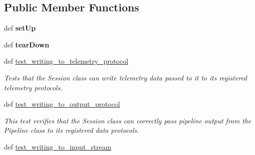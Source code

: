 \subsection*{Public Member Functions}
\begin{DoxyCompactItemize}
\item 
\hypertarget{classhwm_1_1sessions_1_1tests_1_1test__session_1_1_test_session_a6ebfe0c0771bd2fb341e72d71db092a9}{def {\bfseries set\-Up}}\label{classhwm_1_1sessions_1_1tests_1_1test__session_1_1_test_session_a6ebfe0c0771bd2fb341e72d71db092a9}

\item 
\hypertarget{classhwm_1_1sessions_1_1tests_1_1test__session_1_1_test_session_a25226f9f9452d7fa0dfd7c89fd116bcd}{def {\bfseries tear\-Down}}\label{classhwm_1_1sessions_1_1tests_1_1test__session_1_1_test_session_a25226f9f9452d7fa0dfd7c89fd116bcd}

\item 
\hypertarget{classhwm_1_1sessions_1_1tests_1_1test__session_1_1_test_session_a7b43f3f300631450e7f45bedfce982ed}{def \hyperlink{classhwm_1_1sessions_1_1tests_1_1test__session_1_1_test_session_a7b43f3f300631450e7f45bedfce982ed}{test\-\_\-writing\-\_\-to\-\_\-telemetry\-\_\-protocol}}\label{classhwm_1_1sessions_1_1tests_1_1test__session_1_1_test_session_a7b43f3f300631450e7f45bedfce982ed}

\begin{DoxyCompactList}\small\item\em Tests that the Session class can write telemetry data passed to it to its registered telemetry protocols. \end{DoxyCompactList}\item 
\hypertarget{classhwm_1_1sessions_1_1tests_1_1test__session_1_1_test_session_a9fa066025f1f0fa7b153515eb56775ed}{def \hyperlink{classhwm_1_1sessions_1_1tests_1_1test__session_1_1_test_session_a9fa066025f1f0fa7b153515eb56775ed}{test\-\_\-writing\-\_\-to\-\_\-output\-\_\-protocol}}\label{classhwm_1_1sessions_1_1tests_1_1test__session_1_1_test_session_a9fa066025f1f0fa7b153515eb56775ed}

\begin{DoxyCompactList}\small\item\em This test verifies that the Session class can correctly pass pipeline output from the Pipeline class to its registered data protocols. \end{DoxyCompactList}\item 
\hypertarget{classhwm_1_1sessions_1_1tests_1_1test__session_1_1_test_session_a43863ec3e07c86e62727b21c537a5d2f}{def \hyperlink{classhwm_1_1sessions_1_1tests_1_1test__session_1_1_test_session_a43863ec3e07c86e62727b21c537a5d2f}{test\-\_\-writing\-\_\-to\-\_\-input\-\_\-stream}}\label{classhwm_1_1sessions_1_1tests_1_1test__session_1_1_test_session_a43863ec3e07c86e62727b21c537a5d2f}


\end{DoxyCompactItemize}
